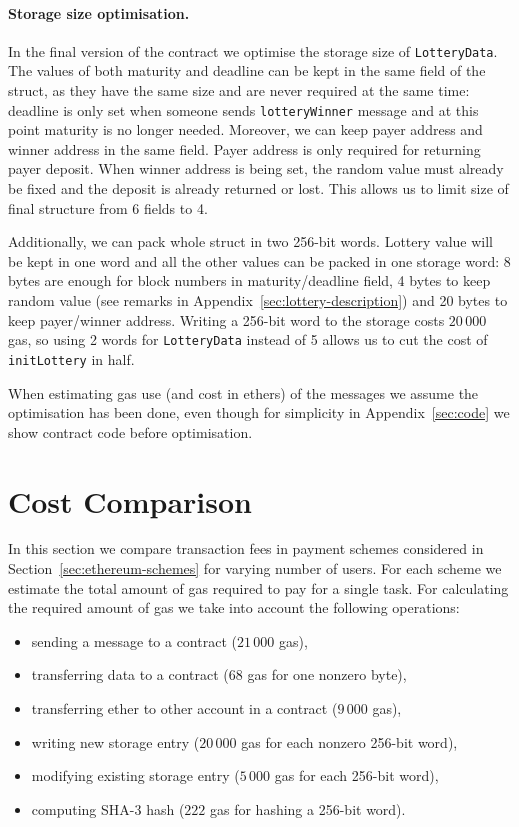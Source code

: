 \documentclass[a4paper]{article}
\begin{document}
    \paragraph{Storage size optimisation.}
    In the final version of the contract we optimise the storage size
    of \verb!LotteryData!. The values of both maturity and deadline
    can be kept in the same field of the struct, as they have the same
    size and are never required at the same time: deadline is only set
    when someone sends \verb!lotteryWinner! message and at this point
    maturity is no longer needed.
    Moreover, we can keep payer address and winner address in the same
    field. Payer address is only required for returning payer
    deposit. When winner address is being set, the random value must
    already be fixed and the deposit is already returned or lost. This
    allows us to limit size of final structure from 6 fields to 4.
    
    Additionally, we can pack whole struct in two 256-bit
    words. Lottery value will be kept in one word and all the other
    values can be packed in one storage word: 8 bytes are enough for
    block numbers in maturity/deadline field, 4 bytes to keep random
    value (see remarks in Appendix~\ref{sec:lottery-description}) and
    20 bytes to keep payer/winner address.  Writing a 256-bit word to
    the storage costs $20\,000$ gas, so using 2 words for \verb!LotteryData!
    instead of 5 allows us to cut the cost of \verb!initLottery! in half.

    When estimating gas use (and cost in ethers) of the messages we
    assume the optimisation has been done, even though for simplicity
    in Appendix~\ref{sec:code} we show contract code before optimisation.
    
\section{Cost Comparison}
\label{sec:costs}
    In this section we compare transaction fees in payment schemes
    considered in Section~\ref{sec:ethereum-schemes} for varying
    number of users. For each scheme we estimate the total amount of
    gas required to pay for a single task.
    For calculating the required amount of gas we take into account the
    following operations:
    \begin{itemize}
    \item sending a message to a contract ($21\,000$ gas),
    \item transferring data to a contract ($68$ gas for one nonzero byte),
    \item transferring ether to other account in a contract ($9\,000$ gas),
    \item writing new storage entry ($20\,000$ gas for each nonzero 256-bit word),
    \item modifying existing storage entry ($5\,000$ gas for each 256-bit word),
    \item computing SHA-3 hash ($222$ gas for hashing a 256-bit word).
    \end{itemize}
\end{document}
